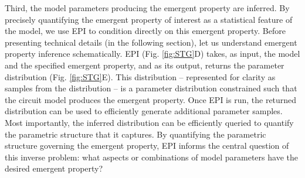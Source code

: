 \documentclass[11pt]{article}
\begin{document}

Third, the model parameters producing the emergent property are inferred.
By precisely quantifying the emergent property of interest as a statistical feature of the model, we use EPI to condition directly on this emergent property.
Before presenting technical details (in the following section), let us understand emergent property inference schematically.
EPI (Fig. \ref{fig:STG}D) takes, as input, the model and the specified emergent property, and as its output, returns the parameter distribution (Fig. \ref{fig:STG}E).  
This distribution -- represented for clarity as samples from the distribution -- is a parameter distribution constrained such that the circuit model produces the emergent property. 
Once EPI is run, the returned distribution can be used to efficiently generate additional parameter samples.
Most importantly, the inferred distribution can be efficiently queried to quantify the parametric structure that it captures.
By quantifying the parametric structure governing the emergent property, EPI  informs the central question of this inverse problem: what aspects or combinations of model parameters have the desired emergent property?
\end{document}
